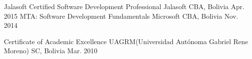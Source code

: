 \begin{cvhonors}
  \cvhonor
    {Jalasoft Certified Software Development Professional}
    {Jalasoft}
    {CBA, Bolivia}
    {Apr. 2015}
  \cvhonor
    {MTA: Software Development Fundamentals}
    {Microsoft}
    {CBA, Bolivia}
    {Nov. 2014}    
\end{cvhonors}

\begin{cvhonors}
  \cvhonor
    {Certificate of Academic Excellence}
    {UAGRM(Universidad Autónoma Gabriel Rene Moreno)}
    {SC, Bolivia}
    {Mar. 2010}
\end{cvhonors}